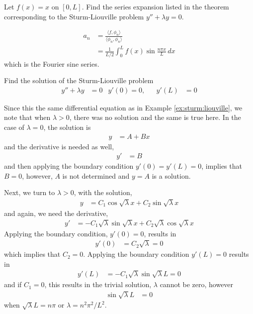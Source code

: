 \begin{example}
Let $f(x)=x$ on $[0,L]$.  Find the series expansion listed in the theorem corresponding to the Sturm-Liouville problem $y''+\lambda y= 0$.  

\solution

\begin{align*}
a_n & = \frac{ \langle f,\phi_n \rangle}{ \langle \phi_n, \phi_n \rangle} \\
& = \frac{1}{L/2} \int_{0}^L f(x) \sin \frac{n\pi x}{L} \, dx 
\end{align*}
which is the Fourier sine series.  

\end{example}


\begin{example} \label{ex:sturm:liouville:2}
Find the solution of the Sturm-Liouville problem
%
\begin{align*}
y'' + \lambda y &= 0 & y'(0) = 0, && y'(L) & = 0 
\end{align*}

\solution 

Since this the same differential equation as in Example \ref{ex:sturm:liouville}, we note that when $\lambda>0$, there was no solution and the same is true here.  In the case of $\lambda=0$, the solution is
%
\begin{align*}
y & = A+Bx
\end{align*}
and the derivative is needed as well,
%
\begin{align*}
y' & = B
\end{align*}
and then applying the boundary condition $y'(0)=y'(L)=0$, implies that $B=0$, however, $A$ is not determined and $y=A$ is a solution. 

Next, we turn to  $\lambda>0$, with the solution,
%
\begin{align*}
y & = C_1 \cos \sqrt{\lambda} x + C_2 \sin \sqrt{\lambda} x
\end{align*}
and again, we need the derivative, 
%
\begin{align*}
y' & = - C_1 \sqrt{\lambda} \sin \sqrt{\lambda} x + C_2 \sqrt{\lambda} \cos \sqrt{\lambda} x 
\end{align*}
Applying the boundary condition, $y'(0)=0$, results in 
%
\begin{align*}
y'(0) & = C_2 \sqrt{\lambda} = 0
\end{align*}
which implies that $C_2=0$.  Applying the boundary condition $y'(L)=0$ results in 
%
\begin{align*}
y'(L) & = -C_1 \sqrt{\lambda} \sin \sqrt{\lambda} L = 0 
\end{align*}
and if $C_1=0$, this results in the trivial solution, $\lambda$ cannot be zero, however
%
\begin{align*}
\sin \sqrt{\lambda} L & = 0
\end{align*}
when $\sqrt{\lambda} L = n \pi$ or $\lambda = n^2 \pi^2/L^2$.  


\end{example}
